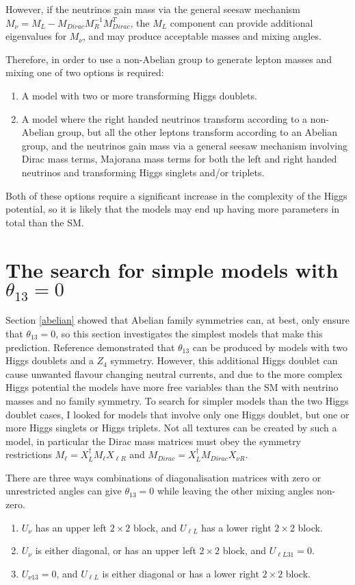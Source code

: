 \documentclass[nofootinbib,showpacs]{revtex4}
\begin{document}
However, if the neutrinos gain mass via the general seesaw mechanism $M_\nu=M_L-M_{Dirac} M_R^{-1} M_{Dirac}^T$, the $M_L$ component can provide additional eigenvalues for $M_\nu$, and may produce acceptable masses and mixing angles.

Therefore, in order to use a non-Abelian group to generate lepton masses and mixing one of two options is required:
\begin{enumerate}
\item A model with two or more transforming Higgs doublets. 
\item A model where the right handed neutrinos transform according to a non-Abelian group, but all the other leptons transform according to an Abelian group, and the neutrinos gain mass via
 a general seesaw mechanism involving Dirac mass terms, Majorana mass terms for both the left and right handed neutrinos and transforming Higgs singlets and/or triplets.
\end{enumerate}
Both of these options require a significant increase in the complexity of the Higgs potential, so it is likely that the models may end up having more parameters in total than the SM. 


\section{The search for simple models with $\theta_{13}=0$}\label{models}
 
Section \ref{abelian} showed that Abelian family symmetries can, at best, only ensure that $\theta_{13}=0$, so this section investigates the simplest models that make this prediction. Reference \cite{nogo2} demonstrated that $\theta_{13}$ can be produced by models with two Higgs doublets and a $Z_4$ symmetry. However, this additional Higgs doublet can cause unwanted flavour changing neutral currents, and due to the more complex Higgs potential the models have more free variables than the SM with neutrino masses and no family symmetry. 
To search for simpler models than the two Higgs doublet cases, I looked for models that involve only one Higgs doublet, but one or more Higgs singlets or Higgs triplets. Not all textures can be created by such a model, in particular the Dirac mass matrices must obey the symmetry restrictions
$M_\ell=X_L^\dagger M_\ell X_{\ell R}$ and $M_{Dirac}=X_L^\dagger M_{Dirac} X_{\nu R}$.    

There are three ways combinations of diagonalisation matrices with zero or unrestricted angles can give $\theta_{13}=0$ while leaving the other mixing angles non-zero.
\begin{enumerate}
\item $U_{\nu}$  has an upper left $2\times 2$ block, and $U_{\ell L}$ has a lower right $2\times 2$ block.


\item $U_{\nu}$  is either diagonal, or has an upper left $2\times 2$ block, and $U_{\ell L 31}=0$.


\item $U_{\nu 13}=0$, and $U_{\ell L}$ is either diagonal or has a lower right $2\times 2$ block.

\end{enumerate}
\end{document}
